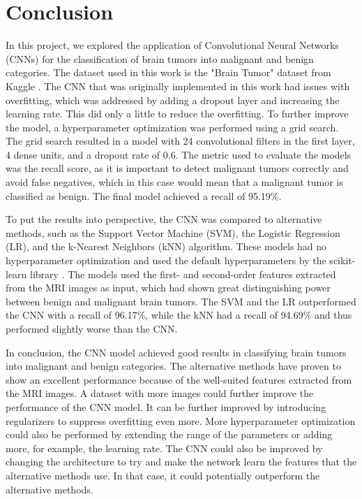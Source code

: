 \chapter{Conclusion}
\label{cha:conclusion}

In this project, we explored the application of Convolutional Neural Networks (CNNs) for the classification of brain tumors into malignant and benign categories.
The dataset used in this work is the "Brain Tumor" dataset from Kaggle \cite{jakesh_bohaju_2020}.
The CNN that was originally implemented in this work had issues with overfitting, which was addressed by adding a dropout layer and increasing the learning rate.
This did only a little to reduce the overfitting.
To further improve the model, a hyperparameter optimization was performed using a grid search.
The grid search resulted in a model with 24 convolutional filters in the first layer, 4 dense units, and a dropout rate of 0.6.
The metric used to evaluate the models was the recall score, as it is important to detect malignant tumors correctly and avoid false negatives, which in this case would mean that a malignant tumor is classified as benign.
The final model achieved a recall of 95.19\%. \newline %

To put the results into perspective, the CNN was compared to alternative methods, such as the Support Vector Machine (SVM), the Logistic Regression (LR), and the k-Nearest Neighbors (kNN) algorithm.
These models had no hyperparameter optimization and used the default hyperparameters by the scikit-learn library \cite{scikit-learn}.
The models used the first- and second-order features extracted from the MRI images as input, which had shown great distinguishing power between benign and malignant brain tumors.
The SVM and the LR outperformed the CNN with a recall of 96.17\%, while the kNN had a recall of 94.69\% and thus performed slightly worse than the CNN.

In conclusion, the CNN model achieved good results in classifying brain tumors into malignant and benign categories.
The alternative methods have proven to show an excellent performance because of the well-suited features extracted from the MRI images.
A dataset with more images could further improve the performance of the CNN model.
It can be further improved by introducing regularizers to suppress overfitting even more.
More hyperparameter optimization could also be performed by extending the range of the parameters or adding more, for example, the learning rate.
The CNN could also be improved by changing the architecture to try and make the network learn the features that the alternative methods use.
In that case, it could potentially outperform the alternative methods.
